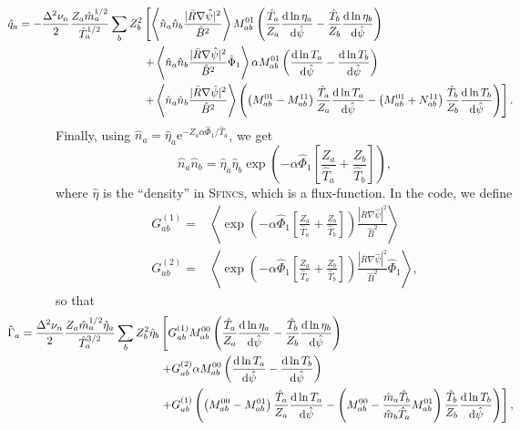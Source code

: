 \documentclass[12pt, a4paper]{article}
\newcommand{\e}{\ensuremath{\mathrm{e}}}
\renewcommand{\d}{\ensuremath{\mathrm{d}}}
\newcommand{\lang}{\left\langle}
\newcommand{\rang}{\right\rangle}
\begin{document}
\begin{equation}
\begin{aligned}
  \hspace*{-10ex} \hat{q}_a =  -\frac{\Delta^2 \nu_n}{2} \frac{Z_a\hat{m}_a^{1/2}}{\hat{T}_a^{1/2}} \sum_b Z_b^2 &\left[
    \lang \hat{n}_a \hat{n}_b\frac{|\bar{R}\nabla \hat{\psi}|^2}{\hat{B}^2 } \rang M_{ab}^{01}\left(\frac{\hat{T}_a}{Z_a}  \frac{\d \ln\eta_a}{\d \hat{\psi}} - \frac{\hat{T}_b}{Z_b}\frac{\d \ln\eta_b}{\d \hat{\psi}}\right) \right.\\
    &\left.+\lang \hat{n}_a \hat{n}_b\frac{|\bar{R}\nabla \hat{\psi}|^2}{\hat{B}^2 }  \hat{\Phi}_1 \rang \alpha M_{ab}^{01} \left(\frac{\d \ln T_a}{\d \hat{\psi}}-\frac{\d \ln T_b}{\d \hat{\psi}}\right) \right.\\
    &\left.+ \lang \hat{n}_a \hat{n}_b\frac{|\bar{R}\nabla \hat{\psi}|^2}{\hat{B}^2 } \rang \left(\left(M_{ab}^{01} - M_{ab}^{11}\right)\frac{ \hat{T}_a}{Z_a} \frac{\d \ln T_a}{\d \hat{\psi}}
    - \left(M_{ab}^{01} + N_{ab}^{11}\right)\frac{\hat{T}_b}{Z_b}\frac{\d \ln T_b}{\d \hat{\psi}}\right) \right].
\end{aligned}
\end{equation}
Finally, using $\hat{n}_a = \hat{\eta}_a \e^{-Z_a \alpha \hat{\Phi}_1/\hat{T}_a}$, we get
\begin{equation}
\hat{n}_a\hat{n}_b = \hat{\eta}_a \hat{\eta}_b \exp{\left(-\alpha\hat{\Phi}_1\left[\frac{Z_a}{\hat{T}_a} + \frac{Z_b}{\hat{T}_b}\right]\right)},
\end{equation}
where $\hat{\eta}$ is the ``density'' in \textsc{Sfincs}, which is a flux-function. In the code, we define
\begin{align}
  G_{ab}^{(1)} =& \lang \exp{\left(-\alpha\hat{\Phi}_1\left[\frac{Z_a}{\hat{T}_a} + \frac{Z_b}{\hat{T}_b}\right]\right)}\frac{|\bar{R}\nabla \hat{\psi}|^2}{\hat{B}^2 } \rang \\
  G_{ab}^{(2)} =& \lang \exp{\left(-\alpha\hat{\Phi}_1\left[\frac{Z_a}{\hat{T}_a} + \frac{Z_b}{\hat{T}_b}\right]\right)}\frac{|\bar{R}\nabla \hat{\psi}|^2}{\hat{B}^2 } \hat{\Phi}_1 \rang,
\end{align}
so that
\begin{equation}
\begin{aligned}
  \hspace*{-10ex} \hat{\Gamma}_a =   \frac{\Delta^2 \nu_n}{2}\frac{Z_a\hat{m}_a^{1/2} \hat{\eta}_a}{\hat{T}_a^{3/2}}\sum_b Z_b^2 \hat{\eta}_b&\left[
    G_{ab}^{(1)} M_{ab}^{00} \left(\frac{ \hat{T}_a}{Z_a}  \frac{\d \ln\eta_a}{\d \hat{\psi}} -\frac{ \hat{T}_b}{Z_b}  \frac{\d \ln\eta_b}{\d \hat{\psi}}\right) \right.\\
    &\left.+    G_{ab}^{(2)} \alpha  M_{ab}^{00} \left(\frac{\d \ln T_a}{\d \hat{\psi}} -\frac{\d \ln T_b}{\d \hat{\psi}}\right) \right.\\
   &\left. +G_{ab}^{(1)}\left(  \left(M_{ab}^{00} - M_{ab}^{01}\right)\frac{ \hat{T}_a}{Z_a}\frac{\d \ln T_a}{\d \hat{\psi}} 
    - \left(M_{ab}^{00} - \frac{\hat{m}_a \hat{T}_b}{\hat{m}_b \hat{T}_a} M_{ab}^{01}\right)\frac{ \hat{T}_b}{Z_b}\frac{\d \ln T_b}{\d \hat{\psi}}\right)\right],
\end{aligned}
\end{equation}
\end{document}
